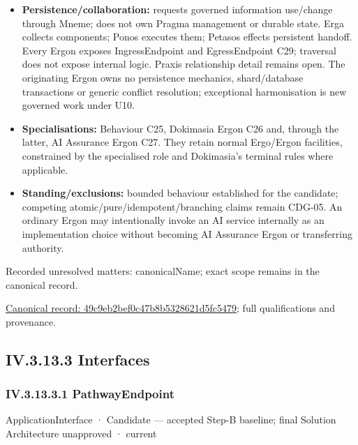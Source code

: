 \begin{itemize}
\item \textbf{Persistence/collaboration:} requests governed information use/change through
  Mneme; does not own Pragma management or durable state. Erga collects components;
  Ponos executes them; Petasos effects persistent handoff. Every Ergon exposes
  IngressEndpoint and EgressEndpoint C29; traversal does not expose internal logic.
  Praxis relationship detail remains open. The originating Ergon owns no persistence
  mechanics, shard/database transactions or generic conflict resolution; exceptional
  harmonisation is new governed work under U10.

\item \textbf{Specialisations:} Behaviour C25, Dokimasia Ergon C26 and, through the latter,
  AI Assurance Ergon C27. They retain normal Ergo/Ergon facilities, constrained
  by the specialised role and Dokimasia's terminal rules where applicable.

\item \textbf{Standing/exclusions:} bounded behaviour established for the candidate;
  competing atomic/pure/idempotent/branching claims remain CDG-05. An ordinary
  Ergon may intentionally invoke an AI service internally as an implementation
  choice without becoming AI Assurance Ergon or transferring authority.

\end{itemize}

{\small Recorded unresolved matters: canonicalName; exact scope remains in the canonical record.}\par
{\footnotesize \href{../../../../continuum/application/application-component/49c9eb2bef0c47b8b5328621d5fc5479.md}{Canonical record: 49c9eb2bef0c47b8b5328621d5fc5479}; full qualifications and provenance.}\par
\subsection*{IV.3.13.3 Interfaces}
\label{navigation:IV.3.13.3}

\subsubsection*{IV.3.13.3.1 PathwayEndpoint}
\label{navigation:IV.3.13.3.1}

\label{element:800789f54ba24f53a354600d5cd43f6f}
{\small ApplicationInterface · Candidate — accepted Step-B baseline; final Solution Architecture unapproved · current}\par

